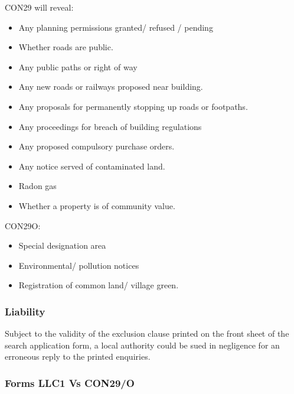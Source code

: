 \documentclass[
]{article}
\providecommand{\tightlist}{%
  \setlength{\itemsep}{0pt}\setlength{\parskip}{0pt}}
\begin{document}
CON29 will reveal:

\begin{itemize}
\tightlist
\item
  Any planning permissions granted/ refused / pending
\item
  Whether roads are public.
\item
  Any public paths or right of way
\item
  Any new roads or railways proposed near building.
\item
  Any proposals for permanently stopping up roads or footpaths.
\item
  Any proceedings for breach of building regulations
\item
  Any proposed compulsory purchase orders.
\item
  Any notice served of contaminated land.
\item
  Radon gas
\item
  Whether a property is of community value.
\end{itemize}

CON29O:

\begin{itemize}
\tightlist
\item
  Special designation area
\item
  Environmental/ pollution notices
\item
  Registration of common land/ village green.
\end{itemize}

\hypertarget{liability-1}{%
\subsubsection{Liability}\label{liability-1}}

Subject to the validity of the exclusion clause printed on the front
sheet of the search application form, a local authority could be sued in
negligence for an erroneous reply to the printed enquiries.

\hypertarget{forms-llc1-vs-con29o}{%
\subsubsection{Forms LLC1 Vs CON29/O}\label{forms-llc1-vs-con29o}}
\end{document}
